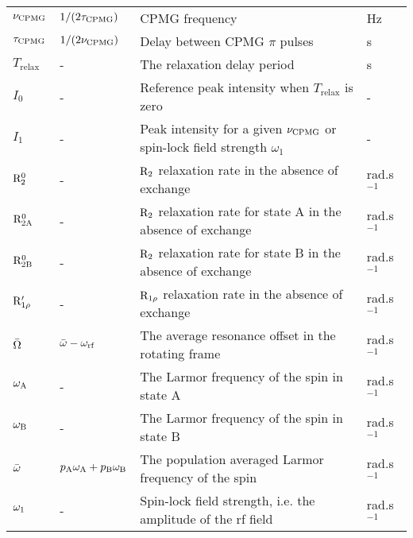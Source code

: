 \begin{landscape}
\begin{center}
\begin{small}
\begin{longtable}{llll}
$\nu_\textrm{CPMG}$          & $1 / (2 \tau_\textrm{CPMG})$             & CPMG frequency                                                                & Hz \\
$\tau_\textrm{CPMG}$         & $1 / (2 \nu_\textrm{CPMG})$              & Delay between CPMG $\pi$ pulses                                               & s \\
$T_\textrm{relax}$ & -                              & The relaxation delay period                                                   & s \\
$I_0$              & -                              & Reference peak intensity when $T_\textrm{relax}$ is zero                      & - \\
$I_1$              & -                              & Peak intensity for a given $\nu_\textrm{CPMG}$ or spin-lock field strength $\omega_1$   & - \\
$\mathrm{R}_2^0$        & -                              & $\mathrm{R}_2$ relaxation rate in the absence of exchange                            & rad.s$^{-1}$ \\
$\mathrm{R}_\mathrm{2A}^0$       & -                              & $\mathrm{R}_2$ relaxation rate for state A in the absence of exchange                & rad.s$^{-1}$ \\
$\mathrm{R}_\mathrm{2B}^0$       & -                              & $\mathrm{R}_2$ relaxation rate for state B in the absence of exchange                & rad.s$^{-1}$ \\
$\mathrm{R}_{1\rho}'$    & -                              & $\mathrm{R}_{1\rho}$ relaxation rate in the absence of exchange                         & rad.s$^{-1}$ \\
$\bar\Omega$       & $\bar\omega - \omega_\textrm{rf}$         & The average resonance offset in the rotating frame                            & rad.s$^{-1}$ \\
$\omega_\textrm{A}$          & -                              & The Larmor frequency of the spin in state A                                   & rad.s$^{-1}$ \\
$\omega_\textrm{B}$          & -                              & The Larmor frequency of the spin in state B                                   & rad.s$^{-1}$ \\
$\bar\omega$        & $p_\textrm{A}\omega_\textrm{A} + p_\textrm{B}\omega_\textrm{B}$      & The population averaged Larmor frequency of the spin                          & rad.s$^{-1}$ \\
$\omega_1$        & -                              & Spin-lock field strength, i.e. the amplitude of the rf field                  & rad.s$^{-1}$ \\

\end{longtable}
\end{small}
\end{center}
\end{landscape}
